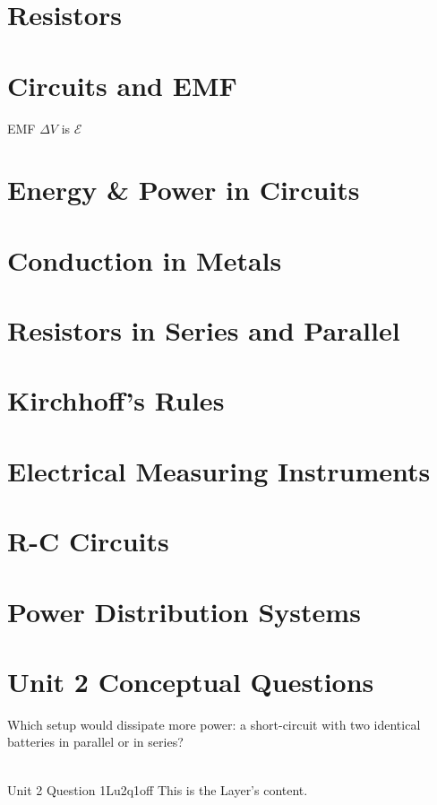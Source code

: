 \documentclass[10pt, a4paper, twocolumn]{article}
\begin{document}
    \section{Resistors}	
        
    \section{Circuits and EMF}	
        EMF $\Delta V$ is $\mathcal{E}$
    \section{Energy \& Power in Circuits}	
    \section{Conduction in Metals}	
    \section{Resistors in Series and Parallel}
    \section{Kirchhoff's Rules}
    \section{Electrical Measuring Instruments}
    \section{R-C Circuits}
    \section{Power Distribution Systems}
    \section{Unit 2 Conceptual Questions}
    Which setup would dissipate more power: a short-circuit with two identical batteries in parallel or in series?\\
    \\
    \begin{ocg}{Unit 2 Question 1}{Lu2q1}{off}
        This is the Layer's content.
    \end{ocg}
\end{document}
